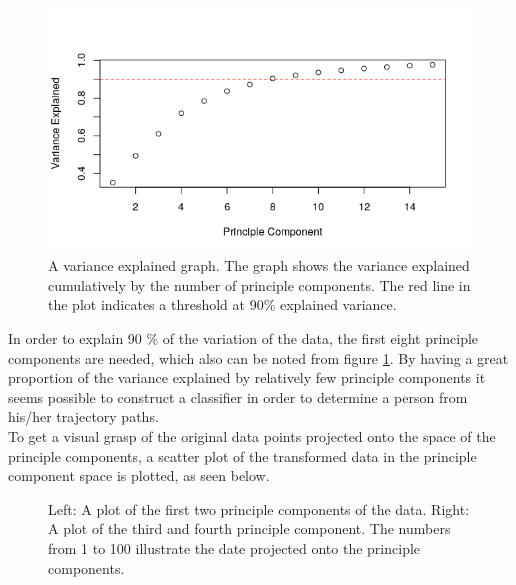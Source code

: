 \documentclass[11pt, fleqn, titlepage]{article}
\begin{document}
\begin{figure}[H]
	\centering
	\includegraphics[width=0.65\linewidth]{billeder/varexp.png}
	\caption{A variance explained graph. The graph shows the variance explained cumulatively by the number of principle components. The red line in the plot indicates a threshold at 90\% explained variance.}
	\label{fig:varexp}
\end{figure}
\noindent
In order to explain 90 \% of the variation of the data, the first eight principle components are needed, which also can be noted from figure \ref{fig:varexp}. By having a great proportion of the variance explained by relatively few principle components it seems possible to construct a classifier in order to determine a person from his/her trajectory paths.
\\
To get a visual grasp of the original data points projected onto the space of the principle components, a scatter plot of the transformed data in the principle component space is plotted, as seen below.

\begin{figure}[H]
	\centering
	\qquad
	\caption{Left: A plot of the first two principle components of the data. Right: A plot of the third and fourth principle component. The numbers from 1 to 100 illustrate the date projected onto the principle components.}%
	\label{fig:example}%
\end{figure}
\newpage
\end{document}
